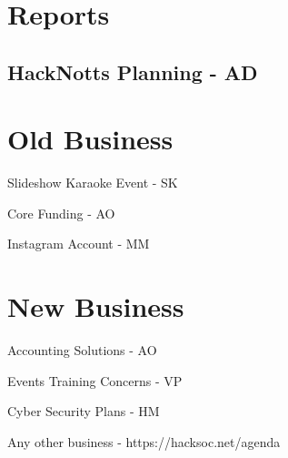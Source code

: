 \documentclass[11pt,hacksoc,agenda]{meetingmins}
\begin{document}
\maketitle

\section{Reports}

\subsection{HackNotts Planning - AD}
\begin{hiddensubitems}
  \item
\end{hiddensubitems}

\section{Old Business}
\begin{items}
  \item Slideshow Karaoke Event - SK
  \item Core Funding - AO
  \item Instagram Account - MM
\end{items}

\section{New Business}
\begin{items}
  \item Accounting Solutions - AO
  \item Events Training Concerns - VP
  \item Cyber Security Plans - HM
  \item Any other business - https://hacksoc.net/agenda
\end{items}

\vspace{1em}
\nextmeeting{}
\end{document}
